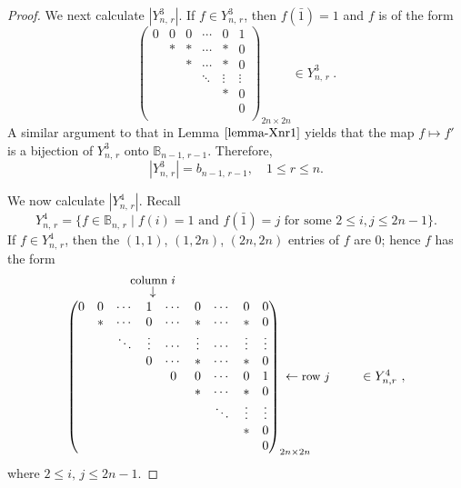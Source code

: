 \documentclass[11pt]{article}
\newcommand{\qq}{\qquad}
\newcommand{\les}{\leqslant}
\begin{document}
\begin{proof}
We next calculate $|Y_{n,\,r}^3|$. If $f\in Y_{n,\,r}^3$, then $f(\bar{1})=1$ and $f$ is of the form
\[
\begin{pmatrix}
            0  & 0 & 0 &\cdots & 0& 1 \\
              & * & * &\cdots & *& 0  \\
              &   & * &\cdots & *& 0 \\
              &   &   &\ddots &\vdots&\vdots \\
              &   &   &       & *& 0  \\
              &   &   &       &  & 0  \\
             \end{pmatrix}_{2n \times 2n}\in Y_{n,\,r}^3~.
\]
A  similar argument to that in Lemma $\ref{lemma-Xnr1}$ yields that the map $f\mapsto f'$
is a bijection of $Y_{n,\,r}^3$ onto $\mathbb B_{n-1,\,r-1}$. Therefore,
\[\label{Ynr3}
    |Y_{n,\,r}^3|=b_{n-1, \,r-1},\quad 1\les r\les n. \tag{4}
\]

We now calculate $|Y_{n,\,r}^4|$. Recall
\[
Y_{n,\,r}^4 = \{f\in \mathbb B_{n,\,r}\mid f(i)=1 \text{ and } f(\bar{1})=j \text{ for some } 2\les i, j\les 2n-1\}.
\]
If $f\in Y_{n,\,r}^4$, then the $(1,1)$, $(1,2n)$, $(2n,2n)$ entries of $f$ are  $0$; hence $f$ has the form
\[
\begin{array}{l@{}l}
\hspace{1.75cm}{\overset{\text{\small{column} $i$}}{\downarrow}}&\\
\begin{pmatrix}
             0 & 0& \cdots &1 & \cdots& 0&\cdots & 0& 0 \\
              & * & \cdots &0 & \cdots& * &\cdots & *& 0 \\
              &   & \ddots   &\vdots&\cdots&\vdots&\cdots & \vdots& \vdots \\
              &   & &0 &\cdots &*&\cdots & *& 0 \\
              &   && &0 &0 & \cdots& 0& 1 \\
              &   &&& &* &\cdots & *& 0 \\
              &   & &&&  &\ddots &\vdots&\vdots \\
              &   & &&&  &       & *& 0  \\
              &   & & && &       &  & 0  \\
             \end{pmatrix}_{2n \times 2n} 
&\hspace*{-2em}\leftarrow\text{\small{row $j$}}\qq~ \in Y_{n,r}^4~,
\end{array}
\]
where  $2\les i,\, j\les 2n-1$. 


\end{proof}
\end{document}
